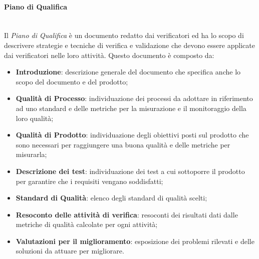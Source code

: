 \paragraph{Piano di Qualifica}\mbox{}\\ [1mm]
Il \textit{Piano di Qualifica} è un documento redatto dai verificatori ed ha lo scopo di descrivere strategie e tecniche di verifica e validazione che devono essere applicate dai verificatori nelle loro attività.
Questo documento è composto da:
\begin{itemize}
	\item \textbf{Introduzione}: descrizione generale del documento che specifica anche lo scopo del documento e del prodotto;
	\item \textbf{Qualità di Processo}: individuazione dei processi da adottare in riferimento ad uno standard e delle metriche per la misurazione e il monitoraggio della loro qualità;
	\item \textbf{Qualità di Prodotto}: individuazione degli obiettivi posti sul prodotto che sono necessari per raggiungere una buona qualità e delle metriche per misurarla;
	\item \textbf{Descrizione dei test}: individuazione dei test a cui sottoporre il prodotto per garantire che i requisiti vengano soddisfatti;
	\item \textbf{Standard di Qualità}: elenco degli standard di qualità scelti;
	\item \textbf{Resoconto delle attività di verifica}: resoconti dei risultati dati dalle metriche di qualità calcolate per ogni attività;
	\item \textbf{Valutazioni per il miglioramento}: esposizione dei problemi rilevati e delle soluzioni da attuare per migliorare.
\end{itemize}
